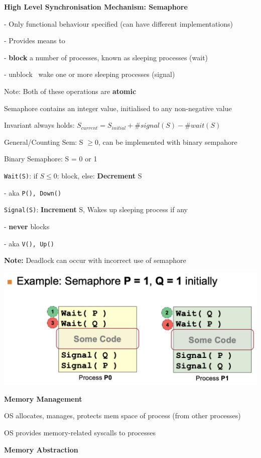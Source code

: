\documentclass[10pt, a4paper]{article}
\newcommand{\highlight}[1]{{\color{red}\textbf{#1}}}
\newcommand{\blue}[1]{{\color{MidnightBlue}#1}}
\newcommand{\red}[1]{{\color{red}#1}}
\newcommand{\green}[1]{{\color{ForestGreen}#1}}
\newcommand{\header}[1]{{\normalsize\textbf{#1}}}
\newcommand{\tab}[0]{\hspace*{2mm}}
\begin{document}
\begin{multicols*}{3}
		\textbf{High Level Synchronisation Mechanism: Semaphore}

		- Only functional behaviour specified (can have different implementations)

		- Provides means to

		\tab{} - \highlight{block} a number of processes, known as sleeping processes (wait)

		\tab{} - unblock \ wake one or more sleeping processes (signal)

		\red{Note}: Both of these operations are \highlight{atomic}

		Semaphore contains an integer value, initialised to any non-negative value

		Invariant \red{always} holds: $S_{current} = S_{initial} + \#signal(S) - \#wait(S)$

		General/Counting Sem: S $\geq 0$, can be implemented with binary sempahore

		Binary Semaphore: S = 0 or 1
		
		\texttt{Wait(S)}: if $S \leq 0$: block, else: \textbf{Decrement} S

		- aka \texttt{P(), Down()}

		\texttt{Signal(S)}: \textbf{Increment} S, Wakes up sleeping process if any

		- \highlight{never} blocks

		- aka \texttt{V(), Up()}

		\highlight{Note:} Deadlock can occur with incorrect use of semaphore

		\includegraphics[scale=0.25]{./assets/semaphore-wrong.png}

		\header{Memory Management}

		OS \blue{allocates}, \green{manages}, \red{protects} mem space of process (from other processes)

		OS provides memory-related \red{syscalls} to processes

		\textbf{Memory Abstraction}


\end{multicols*}
\end{document}
